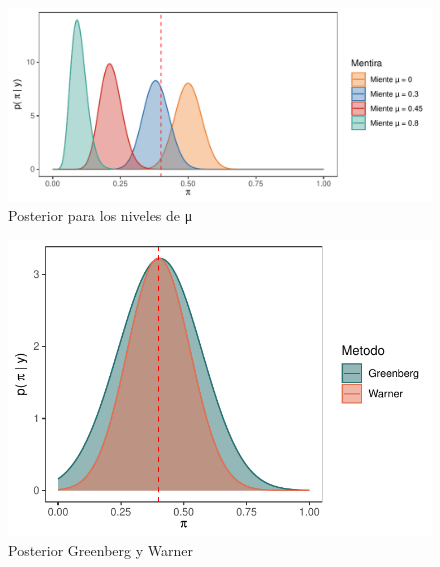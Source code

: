 \documentclass[
]{article}
\begin{document}
\begin{figure}

{\centering \includegraphics{TP-1--Bayes_files/figure-latex/fig6-1} 

}

\caption{Posterior para los niveles de μ}\label{fig:fig6}
\end{figure}

\begin{figure}

{\centering \includegraphics{TP-1--Bayes_files/figure-latex/fig7-1} 

}

\caption{Posterior Greenberg y Warner}\label{fig:fig7}
\end{figure}

\newpage
\end{document}
